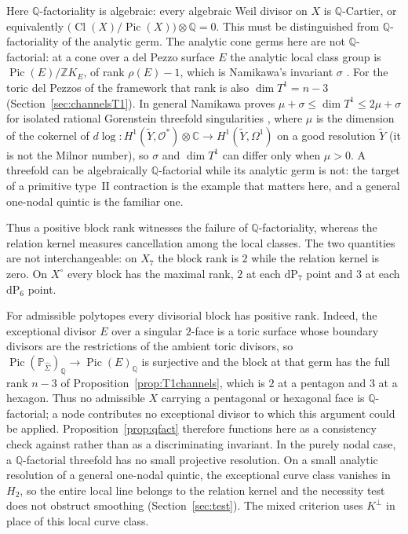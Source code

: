 \documentclass[11pt]{amsart}
\theoremstyle{definition}
\theoremstyle{remark}
\theoremstyle{plain}
\newcommand{\ZZ}{\mathbb{Z}}
\newcommand{\QQ}{\mathbb{Q}}
\newcommand{\CC}{\mathbb{C}}
\newcommand{\PP}{\mathbb{P}}
\newcommand{\cO}{\mathcal{O}}
\newcommand{\Pic}{\operatorname{Pic}}
\newcommand{\Cl}{\operatorname{Cl}}
\newcommand{\dP}{\mathrm{dP}}
\begin{document}
Here $\QQ$-factoriality is algebraic: every algebraic Weil divisor on $X$
is $\QQ$-Cartier, or equivalently
$\bigl(\Cl(X)/\Pic(X)\bigr)\otimes\QQ=0$.  This must be distinguished
from $\QQ$-factoriality of the analytic germ.  The analytic cone germs
here are not $\QQ$-factorial: at a cone over a del Pezzo surface $E$
the analytic local class group is $\Pic(E)/\ZZ K_E$, of rank
$\rho(E)-1$, which is Namikawa's invariant $\sigma$ \cite{Namikawa97}.  For
the toric del Pezzos of the framework that rank is also $\dim T^1=n-3$
(Section~\ref{sec:channelsT1}).  In general Namikawa proves
$\mu+\sigma\le\dim T^1\le2\mu+\sigma$ for isolated rational Gorenstein
threefold singularities \cite[Theorem~1]{Namikawa97}, where $\mu$ is the
dimension of the cokernel of
$d\log\colon H^1(\widetilde Y,\cO^*)\otimes\CC\to H^1(\widetilde Y,\Omega^1)$
on a good resolution $\widetilde Y$ (it is not the Milnor number), so
$\sigma$ and $\dim T^1$ can differ only when $\mu>0$.
A threefold can be algebraically $\QQ$-factorial while its analytic germ
is not: the target of a primitive type~II contraction
is the example that matters here, and a general one-nodal quintic is the
familiar one.

Thus a positive block rank witnesses the failure of $\QQ$-factoriality,
whereas the relation kernel measures cancellation
among the local classes.  The two quantities are not interchangeable: on
$X_7$ the block rank is $2$ while the relation kernel is zero.  On $X^{\circ}$
every block has the maximal rank, $2$ at each $\dP_7$ point and $3$ at each
$\dP_6$ point.

For admissible polytopes every divisorial block has positive rank.
Indeed, the exceptional divisor $E$
over a singular $2$-face is a toric surface whose boundary divisors are the
restrictions of the ambient toric divisors, so
$\Pic(\PP_{\widehat\Sigma})_\QQ\to\Pic(E)_\QQ$ is surjective and the block
at that germ has the full rank $n-3$ of
Proposition~\ref{prop:T1channels}, which is $2$ at a pentagon and $3$ at a
hexagon.  Thus no admissible $X$ carrying a pentagonal or hexagonal face is
$\QQ$-factorial; a node contributes no exceptional divisor to which this
argument could be applied.
Proposition~\ref{prop:qfact} therefore functions here as a consistency
check against \cite[Theorem~5.8]{Gross97} rather than as a discriminating
invariant.  In the purely nodal case, a $\QQ$-factorial threefold has no
small projective resolution.  On a small analytic resolution of a general
one-nodal quintic, the exceptional curve class vanishes in $H_2$, so the
entire local line belongs to the relation kernel and the necessity test
does not obstruct smoothing (Section~\ref{sec:test}).  The mixed
criterion uses $K^{\perp}$ in place of this local curve class.
\end{document}
